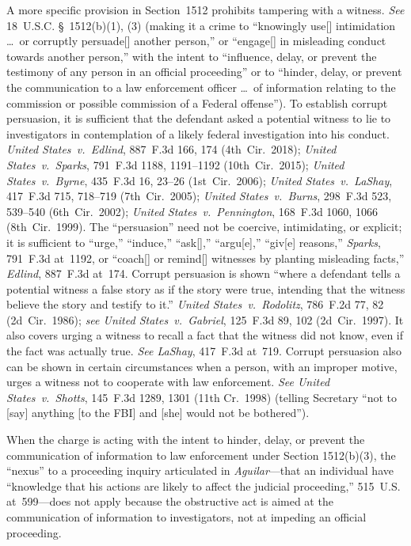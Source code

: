 A more specific provision in Section~1512 prohibits tampering with a witness.
\textit{See} 18~U.S.C. \S~1512(b)(1), (3) (making it a crime to ``knowingly use[] intimidation \dots\ or corruptly persuade[] another person,'' or ``engage[] in misleading conduct towards another person,'' with the intent to ``influence, delay, or prevent the testimony of any person in an official proceeding'' or to ``hinder, delay, or prevent the communication to a law enforcement officer \dots\ of information relating to the commission or possible commission of a Federal offense'').
To establish corrupt persuasion, it is sufficient that the defendant asked a potential witness to lie to investigators in contemplation of a likely federal investigation into his conduct.
\textit{United States~v.\ Edlind}, 887~F.3d 166, 174 (4th~Cir.~2018);
\textit{United States~v.\ Sparks}, 791~F.3d 1188, 1191--1192 (10th~Cir.~2015);
\textit{United States~v.\ Byrne}, 435~F.3d 16, 23--26 (1st~Cir.~2006);
\textit{United States~v.\ LaShay}, 417~F.3d 715, 718--719 (7th~Cir.~2005);
\textit{United States~v.\ Burns}, 298~F.3d 523, 539--540 (6th~Cir.~2002);
\textit{United States~v.\ Pennington}, 168~F.3d 1060, 1066 (8th~Cir.~1999).
The ``persuasion'' need not be coercive, intimidating, or explicit;
it is sufficient to ``urge,'' ``induce,'' ``ask[],'' ``argu[e],'' ``giv[e] reasons,''
\textit{Sparks}, 791~F.3d at~1192, or ``coach[] or remind[] witnesses by planting misleading facts,''
\textit{Edlind}, 887~F.3d at~174.
Corrupt persuasion is shown ``where a defendant tells a potential witness a false story as if the story were true, intending that the witness believe the story and testify to it.''
\textit{United States~v.\ Rodolitz}, 786~F.2d 77, 82 (2d~Cir.~1986);
\textit{see United States~v.\ Gabriel}, 125~F.3d 89, 102 (2d~Cir.~1997).
It also covers urging a witness to recall a fact that the witness did not know, even if the fact was actually true.
\textit{See LaShay}, 417~F.3d at~719.
Corrupt persuasion also can be shown in certain circumstances when a person, with an improper motive, urges a witness not to cooperate with law enforcement.
\textit{See United States~v.\ Shotts}, 145~F.3d 1289, 1301 (11th Cr.~1998) (telling Secretary ``not to [say] anything [to the FBI] and [she] would not be bothered'').

When the charge is acting with the intent to hinder, delay, or prevent the communication of information to law enforcement under Section 1512(b)(3), the ``nexus'' to a proceeding inquiry articulated in \textit{Aguilar}---that an individual have ``knowledge that his actions are likely to affect the judicial proceeding,'' 515~U.S. at~599---does not apply because the obstructive act is aimed at the communication of information to investigators, not at impeding an official proceeding.

